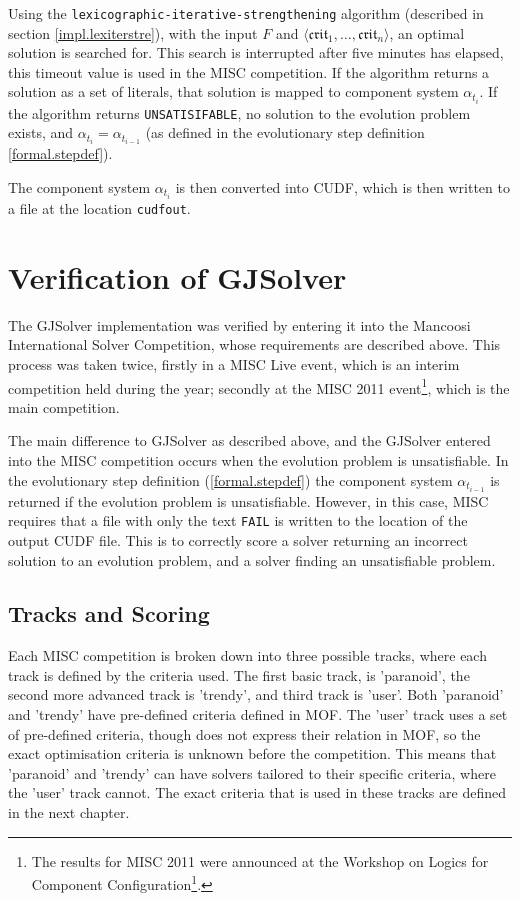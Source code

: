 Using the \texttt{lexicographic-iterative-strengthening} algorithm (described in section \ref{impl.lexiterstre}),
with the input $F$ and $\langle \mathfrak{crit}_1, \ldots ,\mathfrak{crit}_n \rangle$, an optimal solution is searched for.
This search is interrupted after five minutes has elapsed, this timeout value is used in the MISC competition.
If the algorithm returns a solution as a set of literals, that solution is mapped to component system $\alpha_{t_i}$.
If the algorithm returns \texttt{UNSATISIFABLE}, no solution to the evolution problem exists, and $\alpha_{t_i} = \alpha_{t_{i-1}}$ 
(as defined in the evolutionary step definition \ref{formal.stepdef}).

The component system $\alpha_{t_i}$ is then converted into CUDF, which is then written to a file at the location \verb+cudfout+.

\section{Verification of GJSolver}
\label{impl.verif}
The GJSolver implementation was verified by entering it into the Mancoosi International Solver Competition, whose requirements are described above.
This process was taken twice, firstly in a MISC Live event, which is an interim competition held during the year;
secondly at the MISC 2011 event\footnote{The results for MISC 2011 were announced at the Workshop on Logics for Component Configuration\footnote{http://www.pps.jussieu.fr/~treinen/lococo/2011/ accessed 6/3/2012}.}, 
which is the main competition. 

The main difference to GJSolver as described above, and the GJSolver entered into the MISC competition occurs when the evolution problem is unsatisfiable.
In the evolutionary step definition (\ref{formal.stepdef}) the component system $\alpha_{t_{i-1}}$ is returned if the evolution problem is unsatisfiable.
However, in this case, MISC requires that a file with only the text \texttt{FAIL} is written to the location of the output CUDF file.
This is to correctly score a solver returning an incorrect solution to an evolution problem, 
and a solver finding an unsatisfiable problem.

\subsection{Tracks and Scoring}
Each MISC competition is broken down into three possible tracks, where each track is defined by the criteria used.
The first basic track, is 'paranoid', the second more advanced track is 'trendy', and third track is 'user'.
Both 'paranoid' and 'trendy' have pre-defined criteria defined in MOF.
The 'user' track uses a set of pre-defined criteria, though does not express their relation in MOF, so the exact optimisation criteria is unknown before the competition.
This means that 'paranoid' and 'trendy' can have solvers tailored to their specific criteria, where the 'user' track cannot.
The exact criteria that is used in these tracks are defined in the next chapter.

